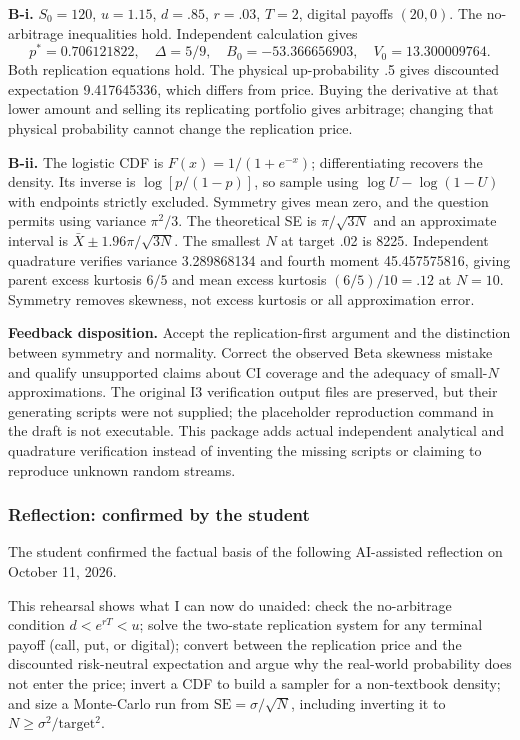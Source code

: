 \textbf{B-i.} $S_0=120$, $u=1.15$, $d=.85$, $r=.03$, $T=2$, digital payoffs $(20,0)$. The no-arbitrage inequalities hold. Independent calculation gives
\[
p^*=0.706121822,\quad\Delta=5/9,\quad B_0=-53.366656903,
\quad V_0=13.300009764.
\]
Both replication equations hold. The physical up-probability .5 gives discounted expectation 9.417645336, which differs from price. Buying the derivative at that lower amount and selling its replicating portfolio gives arbitrage; changing that physical probability cannot change the replication price.

\textbf{B-ii.} The logistic CDF is $F(x)=1/(1+e^{-x})$; differentiating recovers the density. Its inverse is $\log[p/(1-p)]$, so sample using $\log U-\log(1-U)$ with endpoints strictly excluded. Symmetry gives mean zero, and the question permits using variance $\pi^2/3$. The theoretical SE is $\pi/\sqrt{3N}$ and an approximate interval is $\bar X\pm1.96\pi/\sqrt{3N}$. The smallest $N$ at target .02 is 8225. Independent quadrature verifies variance 3.289868134 and fourth moment 45.457575816, giving parent excess kurtosis $6/5$ and mean excess kurtosis $(6/5)/10=.12$ at $N=10$. Symmetry removes skewness, not excess kurtosis or all approximation error.

\textbf{Feedback disposition.} Accept the replication-first argument and the distinction between symmetry and normality. Correct the observed Beta skewness mistake and qualify unsupported claims about CI coverage and the adequacy of small-$N$ approximations. The original I3 verification output files are preserved, but their generating scripts were not supplied; the placeholder reproduction command in the draft is not executable. This package adds actual independent analytical and quadrature verification instead of inventing the missing scripts or claiming to reproduce unknown random streams.

\subsubsection*{Reflection: confirmed by the student}
The student confirmed the factual basis of the following AI-assisted reflection on October 11, 2026.

This rehearsal shows what I can now do unaided: check the no-arbitrage
condition $d<e^{rT}<u$; solve the two-state replication system for any
terminal payoff (call, put, or digital); convert between the replication price
and the discounted risk-neutral expectation and argue why the real-world
probability does not enter the price; invert a CDF to build a sampler for a
non-textbook density; and size a Monte-Carlo run from $\mathrm{SE}=\sigma/\sqrt N$, including
inverting it to $N\geq\sigma^2/\mathrm{target}^2$.

